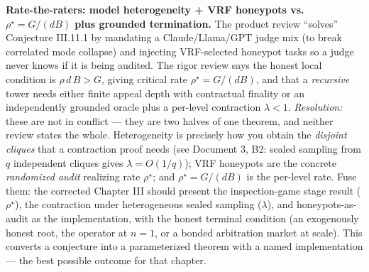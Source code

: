 \documentclass[11pt,a4paper]{article}
\begin{document}
\begin{adj}\textbf{Rate-the-raters: model heterogeneity + VRF honeypots vs.\ $\rho^\star=G/(dB)$ plus grounded termination.} The product review ``solves'' Conjecture III.11.1 by mandating a Claude/Llama/GPT judge mix (to break correlated mode collapse) and injecting VRF-selected honeypot tasks so a judge never knows if it is being audited. The rigor review says the honest local condition is $\rho\, d\, B > G$, giving critical rate $\rho^\star = G/(dB)$, and that a \emph{recursive} tower needs either finite appeal depth with contractual finality or an independently grounded oracle plus a per-level contraction $\lambda<1$. \emph{Resolution:} these are not in conflict --- they are two halves of one theorem, and neither review states the whole. Heterogeneity is precisely how you obtain the \emph{disjoint cliques} that a contraction proof needs (see Document 3, B2: sealed sampling from $q$ independent cliques gives $\lambda = O(1/q)$); VRF honeypots are the concrete \emph{randomized audit} realizing rate $\rho^\star$; and $\rho^\star = G/(dB)$ is the per-level rate. Fuse them: the corrected Chapter III should present the inspection-game stage result ($\rho^\star$), the contraction under heterogeneous sealed sampling ($\lambda$), and honeypots-as-audit as the implementation, with the honest terminal condition (an exogenously honest root, the operator at $n{=}1$, or a bonded arbitration market at scale). This converts a conjecture into a parameterized theorem with a named implementation --- the best possible outcome for that chapter.
\end{adj}
\end{document}
